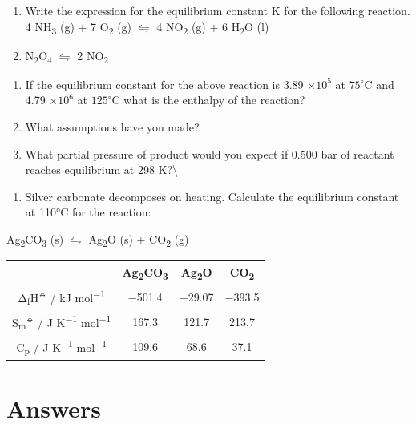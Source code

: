 \documentclass[
]{book}
\providecommand{\tightlist}{%
  \setlength{\itemsep}{0pt}\setlength{\parskip}{0pt}}
\begin{document}
\begin{enumerate}
\def\labelenumi{\arabic{enumi}.}
\item
  Write the expression for the equilibrium constant K for the following reaction.
  4 NH\textsubscript{3} (g) + 7 O\textsubscript{2} (g) \(\leftrightharpoons\) 4 NO\textsubscript{2} (g) + 6 H\textsubscript{2}O (l)
\item
  N\textsubscript{2}O\textsubscript{4} \(\leftrightharpoons\) 2 NO\textsubscript{2}
\end{enumerate}

\begin{enumerate}
\def\labelenumi{\alph{enumi}.}
\item
  If the equilibrium constant for the above reaction is 3.89 \(\times 10^5\) at \(75 ^{\circ}\)C and 4.79 \(\times 10^6\) at \(125 ^{\circ}\)C what is the enthalpy of the reaction?
\item
  What assumptions have you made?
\item
  What partial pressure of product would you expect if 0.500 bar of reactant reaches equilibrium at 298 K?\textbackslash{}
\end{enumerate}

\begin{enumerate}
\def\labelenumi{\arabic{enumi}.}
\setcounter{enumi}{2}
\tightlist
\item
  Silver carbonate decomposes on heating. Calculate the equilibrium constant at 110°C for the reaction:
\end{enumerate}

Ag\textsubscript{2}CO\textsubscript{3} (s) \(\leftrightharpoons\) Ag\textsubscript{2}O (s) + CO\textsubscript{2} (g)

\begin{longtable}[]{@{}cccc@{}}
\toprule
& Ag\textsubscript{2}CO\textsubscript{3} & Ag\textsubscript{2}O & CO\textsubscript{2}\tabularnewline
\midrule
\endhead
Δ\textsubscript{f}H\textsuperscript{⦵} / kJ mol\textsuperscript{−1} & −501.4 & −29.07 & −393.5\tabularnewline
S\textsubscript{m}\textsuperscript{⦵} / J K\textsuperscript{−1} mol\textsuperscript{−1} & 167.3 & 121.7 & 213.7\tabularnewline
C\textsubscript{p} / J K\textsuperscript{−1} mol\textsuperscript{−1} & 109.6 & 68.6 & 37.1\tabularnewline
\bottomrule
\end{longtable}

\hypertarget{sec:w4p2answer}{%
\section{Answers}\label{sec:w4p2answer}}
\end{document}
